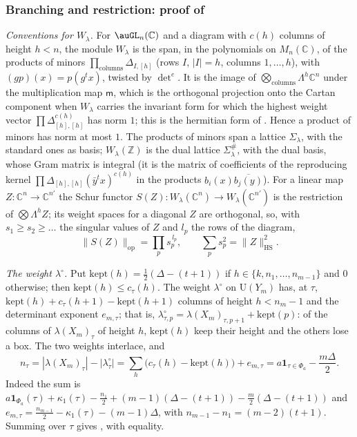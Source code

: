 \documentclass[10pt]{amsart}
\theoremstyle{definition}
\theoremstyle{remark}
\newcommand{\C}{\mathbb C}
\newcommand{\Z}{\mathbb Z}
\providecommand{\auPa}{\Phi_a}
\providecommand{\auU}{\mathrm U}
\begin{document}
\subsubsection{Branching and restriction: proof of \texorpdfstring{{\cite[Proposition~14.24]{P46}}}{[Row D, Proposition~14.24]}}
\label{ps:ss-restrict}

\emph{Conventions for $W_\lambda$.} For $\auGL_n(\C)$ and a diagram with $c(h)$ columns of height
$h<n$, the module $W_\lambda$ is the span, in the polynomials on $M_n(\C)$, of the products of
minors $\prod_{\text{columns}}\Delta_{I,[h]}$ (rows $I$, $|I|=h$, columns $1,\dots,h$), with
$(gp)(x)=p(g^tx)$, twisted by $\det^e$. It is the image of $\bigotimes_{\text{columns}}\Lambda^h
\C^n$ under the multiplication map $\mathsf m$, which is the orthogonal projection onto the Cartan
component when $W_\lambda$ carries the invariant form for which the highest weight vector
$\prod\Delta_{[h],[h]}^{c(h)}$ has norm $1$; this is the hermitian form of {\cite[\S14.3]{P46}}.
Hence a product of minors has norm at most $1$. The products of minors span a lattice
$\Sigma_\lambda$, with the standard ones as basis; $W_\lambda(\Z)$ is the dual lattice
$\Sigma_\lambda^\#$, with the dual basis, whose Gram matrix is integral (it is the matrix of
coefficients of the reproducing kernel $\prod\Delta_{[h],[h]}(\bar y^tx)^{c(h)}$ in the products
$b_i(x)\overline{b_j(y)}$). For a linear map $Z\colon\C^n\to\C^{n'}$ the Schur functor
$S(Z)\colon W_\lambda(\C^n)\to W_\lambda(\C^{n'})$ is the restriction of $\bigotimes\Lambda^hZ$; its
weight spaces for a diagonal $Z$ are orthogonal, so, with $s_1\ge s_2\ge\dots$ the singular values
of $Z$ and $l_p$ the rows of the diagram,
\begin{equation}\label{ps:eq-schurnorm}
\|S(Z)\|_{\mathrm{op}}=\prod_ps_p^{\,l_p},\qquad\sum_ps_p^2=\|Z\|_{\mathrm{HS}}^2 .
\end{equation}

\emph{The weight $\lambda^\circ$.} Put $\mathrm{kept}(h)=\tfrac12(\Delta-(t+1))$ if $h\in\{k,n_1,
\dots,n_{m-1}\}$ and $0$ otherwise; then $\mathrm{kept}(h)\le c_\tau(h)$. The weight
$\lambda^\circ$ on $\auU(Y_m)$ has, at $\tau$, $\mathrm{kept}(h)+c_\tau(h+1)-\mathrm{kept}(h+1)$
columns of height $h<n_m-1$ and the determinant exponent $e_{m,\tau}$; that is,
$\lambda^\circ_{\tau,p}=\lambda(X_m)_{\tau,p+1}+\mathrm{kept}(p)$: of the columns of
$\lambda(X_m)_\tau$ of height $h$, $\mathrm{kept}(h)$ keep their height and the others lose a box.
The two weights interlace, and
\begin{equation}\label{ps:eq-ntau}
n_\tau=|\lambda(X_m)_\tau|-|\lambda^\circ_\tau|=\sum_h\bigl(c_\tau(h)-\mathrm{kept}(h)\bigr)+e_{m,\tau}
=a\mathbf 1_{\tau\in\auPa}-\frac{m\Delta}2 .
\end{equation}
Indeed the sum is $a\mathbf 1_{\auPa}(\tau)+\kappa_1(\tau)-\tfrac{n_1}2+(m-1)(\Delta-(t+1))-\tfrac m2
(\Delta-(t+1))$ and $e_{m,\tau}=\tfrac{n_{m-1}}2-\kappa_1(\tau)-(m-1)\Delta$, with
$n_{m-1}-n_1=(m-2)(t+1)$. Summing over $\tau$ gives {\cite[(41)]{P46}}, with equality.
\end{document}
